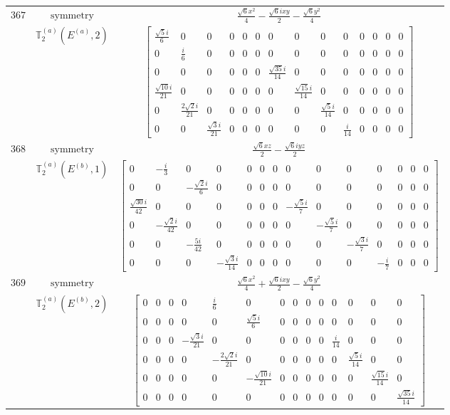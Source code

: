 \documentclass[fleqn,8pt,landscape]{jsarticle}
\begin{document}
\begin{longtable}{ccc}
$ 367 $ & $ \text{symmetry} $ & $ \frac{\sqrt{6} x^{2}}{4} - \frac{\sqrt{6} i x y}{2} - \frac{\sqrt{6} y^{2}}{4} $ \\
$  $ & $ \mathbb{T}_{2}^{(a)}(E^{(a)},2) $ & $ \begin{bmatrix} \frac{\sqrt{5} i}{6} & 0 & 0 & 0 & 0 & 0 & 0 & 0 & 0 & 0 & 0 & 0 & 0 & 0 \\ 0 & \frac{i}{6} & 0 & 0 & 0 & 0 & 0 & 0 & 0 & 0 & 0 & 0 & 0 & 0 \\ 0 & 0 & 0 & 0 & 0 & 0 & \frac{\sqrt{35} i}{14} & 0 & 0 & 0 & 0 & 0 & 0 & 0 \\ \frac{\sqrt{10} i}{21} & 0 & 0 & 0 & 0 & 0 & 0 & \frac{\sqrt{15} i}{14} & 0 & 0 & 0 & 0 & 0 & 0 \\ 0 & \frac{2 \sqrt{2} i}{21} & 0 & 0 & 0 & 0 & 0 & 0 & \frac{\sqrt{5} i}{14} & 0 & 0 & 0 & 0 & 0 \\ 0 & 0 & \frac{\sqrt{3} i}{21} & 0 & 0 & 0 & 0 & 0 & 0 & \frac{i}{14} & 0 & 0 & 0 & 0 \end{bmatrix} $ \\ \hline
$ 368 $ & $ \text{symmetry} $ & $ \frac{\sqrt{6} x z}{2} - \frac{\sqrt{6} i y z}{2} $ \\
$  $ & $ \mathbb{T}_{2}^{(a)}(E^{(b)},1) $ & $ \begin{bmatrix} 0 & - \frac{i}{3} & 0 & 0 & 0 & 0 & 0 & 0 & 0 & 0 & 0 & 0 & 0 & 0 \\ 0 & 0 & - \frac{\sqrt{2} i}{6} & 0 & 0 & 0 & 0 & 0 & 0 & 0 & 0 & 0 & 0 & 0 \\ \frac{\sqrt{30} i}{42} & 0 & 0 & 0 & 0 & 0 & 0 & - \frac{\sqrt{5} i}{7} & 0 & 0 & 0 & 0 & 0 & 0 \\ 0 & - \frac{\sqrt{2} i}{42} & 0 & 0 & 0 & 0 & 0 & 0 & - \frac{\sqrt{5} i}{7} & 0 & 0 & 0 & 0 & 0 \\ 0 & 0 & - \frac{5 i}{42} & 0 & 0 & 0 & 0 & 0 & 0 & - \frac{\sqrt{3} i}{7} & 0 & 0 & 0 & 0 \\ 0 & 0 & 0 & - \frac{\sqrt{3} i}{14} & 0 & 0 & 0 & 0 & 0 & 0 & - \frac{i}{7} & 0 & 0 & 0 \end{bmatrix} $ \\ \hline
$ 369 $ & $ \text{symmetry} $ & $ \frac{\sqrt{6} x^{2}}{4} + \frac{\sqrt{6} i x y}{2} - \frac{\sqrt{6} y^{2}}{4} $ \\
$  $ & $ \mathbb{T}_{2}^{(a)}(E^{(b)},2) $ & $ \begin{bmatrix} 0 & 0 & 0 & 0 & \frac{i}{6} & 0 & 0 & 0 & 0 & 0 & 0 & 0 & 0 & 0 \\ 0 & 0 & 0 & 0 & 0 & \frac{\sqrt{5} i}{6} & 0 & 0 & 0 & 0 & 0 & 0 & 0 & 0 \\ 0 & 0 & 0 & - \frac{\sqrt{3} i}{21} & 0 & 0 & 0 & 0 & 0 & 0 & \frac{i}{14} & 0 & 0 & 0 \\ 0 & 0 & 0 & 0 & - \frac{2 \sqrt{2} i}{21} & 0 & 0 & 0 & 0 & 0 & 0 & \frac{\sqrt{5} i}{14} & 0 & 0 \\ 0 & 0 & 0 & 0 & 0 & - \frac{\sqrt{10} i}{21} & 0 & 0 & 0 & 0 & 0 & 0 & \frac{\sqrt{15} i}{14} & 0 \\ 0 & 0 & 0 & 0 & 0 & 0 & 0 & 0 & 0 & 0 & 0 & 0 & 0 & \frac{\sqrt{35} i}{14} \end{bmatrix} $ \\ \hline

\end{longtable}
\end{document}
